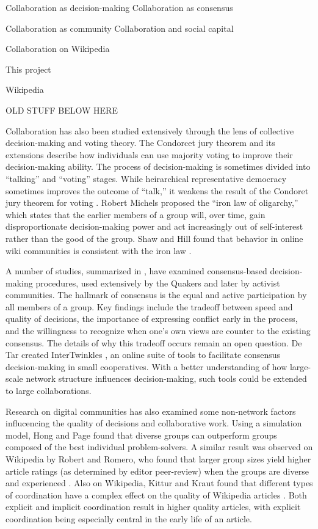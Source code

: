 \documentclass[10pt,twocolumn]{article}
\newcommand{\+}{\phantom{-}}
\begin{document}
Collaboration as decision-making
Collaboration as consensus

Collaboration as community
Collaboration and social capital

Collaboration on Wikipedia

This project

Wikipedia

OLD STUFF BELOW HERE



Collaboration has also been studied extensively through the lens of collective
decision-making and voting theory.
The Condorcet jury theorem and its extensions \cite{list_epistemic_2001}
describe how individuals can use majority voting to improve their
decision-making ability.
The process of decision-making is sometimes divided into
``talking'' and ``voting'' stages.
While heirarchical representative democracy sometimes improves the outcome
of ``talk,'' it weakens the result of the Condoret jury theorem for voting
\cite{list_epistemic_2001}.
Robert Michels proposed the ``iron law of oligarchy,''
\cite{michels_political_1999} which states that
the earlier members of a group will, over time, gain disproportionate
decision-making power and act increasingly out of self-interest rather than
the good of the group.
Shaw and Hill found that behavior in online wiki communities is consistent
with the iron law \cite{shaw_laboratories_2014}.

A number of studies, summarized in \cite{gentry_consensus_1982},
have examined consensus-based decision-making procedures, used extensively by
the Quakers and later by activist communities.
The hallmark of consensus is the equal and active participation by all members
of a group.
Key findings include the tradeoff between speed and quality of decisions,
the importance of expressing conflict early in the process,
and the willingness to recognize when one's own views are counter to the
existing consensus.
The details of why this tradeoff occurs remain an open question.
De Tar created InterTwinkles \cite{detar_intertwinkles:_2013},
an online suite of tools to facilitate consensus decision-making
in small cooperatives.
With a better understanding of how large-scale network structure influences
decision-making, such tools could be extended to large collaborations.

Research on digital communities has also examined some non-network factors
influcencing the quality of decisions and collaborative work.
Using a simulation model, Hong and Page \cite{hong_groups_2004} found that
diverse groups can outperform groups composed of the best individual
problem-solvers.
A similar result was observed on Wikipedia by
Robert and Romero, who found that
larger group sizes yield higher article ratings
(as determined by editor peer-review)
when the groups are diverse and experienced
\cite{robert_when_2015}.
Also on Wikipedia,
Kittur and Kraut found that different types of coordination have a complex
effect on the quality of Wikipedia articles \cite{kittur_harnessing_2008}.
Both explicit and implicit coordination result in higher quality articles,
with explicit coordination being especially central in the early life of an
article.
\end{document}
